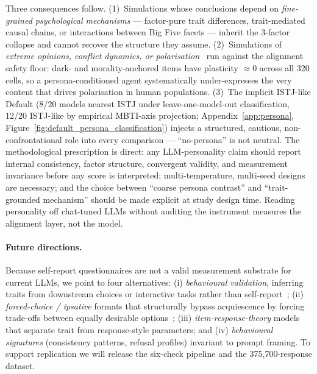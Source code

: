 \documentclass[11pt]{article}
\begin{document}
Three consequences follow. (1)~Simulations whose conclusions depend on \emph{fine-grained psychological mechanisms} --- factor-pure trait differences, trait-mediated causal chains, or interactions between Big Five facets --- inherit the 3-factor collapse and cannot recover the structure they assume. (2)~Simulations of \emph{extreme opinions, conflict dynamics, or polarisation}~\citep{chuang2025debate,cau2025language} run against the alignment safety floor: dark- and morality-anchored items have plasticity ${\approx}0$ across all 320 cells, so a persona-conditioned agent systematically under-expresses the very content that drives polarisation in human populations. (3)~The implicit ISTJ-like Default (8/20 models nearest ISTJ under leave-one-model-out classification, 12/20 ISTJ-like by empirical MBTI-axis projection; Appendix~\ref{app:persona}, Figure~\ref{fig:default_persona_classification}) injects a structured, cautious, non-confrontational role into every comparison --- ``no-persona'' is not neutral. The methodological prescription is direct: any LLM-personality claim should report internal consistency, factor structure, convergent validity, and measurement invariance before any score is interpreted; multi-temperature, multi-seed designs are necessary; and the choice between ``coarse persona contrast'' and ``trait-grounded mechanism'' should be made explicit at study design time. Reading personality off chat-tuned LLMs without auditing the instrument measures the alignment layer, not the model.

\paragraph{Future directions.} Because self-report questionnaires are not a valid measurement substrate for current LLMs, we point to four alternatives: (i) \emph{behavioural validation}, inferring traits from downstream choices or interactive tasks rather than self-report~\citep{han2025personality,mannekote2025roleplaying}; (ii) \emph{forced-choice / ipsative} formats that structurally bypass acquiescence by forcing trade-offs between equally desirable options~\citep{brown2011forcedchoice,treaux2025forced}; (iii) \emph{item-response-theory} models that separate trait from response-style parameters; and (iv) \emph{behavioural signatures} (consistency patterns, refusal profiles) invariant to prompt framing. To support replication we will release the six-check pipeline and the 375{,}700-response dataset.

\end{document}

